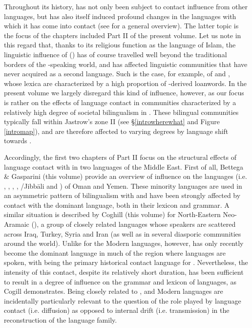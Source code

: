 \documentclass[output=paper]{langsci/langscibook}
\begin{document}
Throughout its history,  has not only been subject to contact influence from other languages, but has also itself induced profound changes in the languages with which it has come into contact (see \citealt{Versteegh2001article} for a general overview). The latter topic is the focus of the chapters included Part II of the present volume. Let us note in this regard that, thanks to its religious function as the language of Islam, the linguistic influence of ()  has of course travelled well beyond the traditional borders of the -speaking world, and has affected linguistic communities that have never acquired  as a second language. Such is the case, for example, of  and , whose lexica are characterized by a high proportion of -derived {loanwords}. In the present volume we largely disregard this kind of influence, however, as our focus is rather on the effects of language contact in communities characterized by a relatively high degree of societal {bilingualism} in . These bilingual communities typically fall within Jastrow’s zone II (see §\ref{introwherewhat} and Figure \ref{intromap}), and are therefore affected to varying degrees by {language shift} towards .

Accordingly, the first two chapters of Part II focus on the structural effects of language contact with  in two  languages of the Middle East. First of all, Bettega \& Gasparini (this volume) provide an overview of  influence on the  languages (i.e. , , , , /Jibbāli and ) of {Oman} and {Yemen}. These minority languages are used in an asymmetric pattern of {bilingualism} with  and have been strongly affected by contact with the dominant language, both in their lexicon and grammar. A similar situation is described by Coghill (this volume) for North-Eastern Neo-Aramaic (), a group of closely related languages whose speakers are scattered across Iraq, Turkey, Syria and Iran (as well as in several diasporic communities around the world). Unlike for the Modern  languages, however,  has only recently become the dominant language in much of the region where  languages are spoken, with  being the primary historical contact language for . Nevertheless, the intensity of this contact, despite its relatively short duration, has been sufficient to result in a degree of influence on the grammar and lexicon of  languages, as Cogill demonstrates. Being closely related to ,  and Modern  languages are incidentally particularly relevant to the question of the role played by language contact (i.e. {diffusion}) as opposed to internal drift (i.e. {transmission}) in the reconstruction of the  language family.
\end{document}
